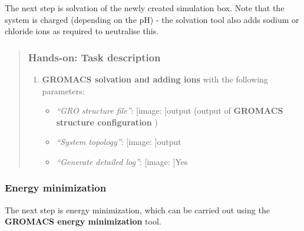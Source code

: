 \documentclass[twocolumn]{bmcart}%
\def\texttt{[image: ]}
\providecommand{\tightlist}{%
  \setlength{\itemsep}{0pt}\setlength{\parskip}{0pt}}
\begin{document}
The next step is solvation of the newly created simulation box. Note
that the system is charged (depending on the pH) - the solvation tool
also adds sodium or chloride ions as required to neutralise this.

\begin{quote}
\hypertarget{hands-on-task-description-4}{%
\subsubsection{Hands-on: Task
description}\label{hands-on-task-description-4}}

\begin{enumerate}
\def\labelenumi{\arabic{enumi}.}
\tightlist
\item
  \textbf{GROMACS solvation and adding ions} with the following
  parameters:

  \begin{itemize}
  \tightlist
  \item
    \emph{``GRO structure file''}: \texttt{output} (output of
    \textbf{GROMACS structure configuration} )
  \item
    \emph{``System topology''}: \texttt{output}
  \item
    \emph{``Generate detailed log''}: \texttt{Yes}
  \end{itemize}
\end{enumerate}


\end{quote}

\hypertarget{energy-minimization}{%
\subsubsection{Energy minimization}\label{energy-minimization}}

The next step is energy minimization, which can be carried out using the
\textbf{GROMACS energy minimization} tool.
\end{document}

